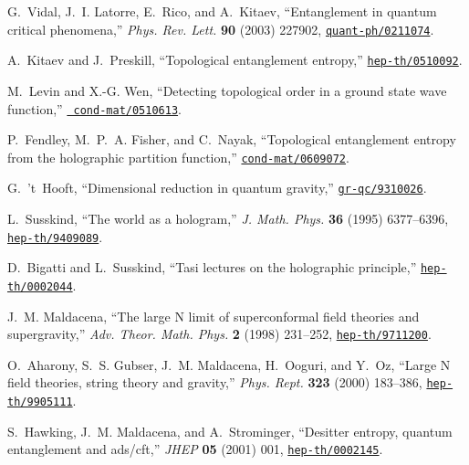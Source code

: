 \documentclass[12pt]{article}
\begin{document}
\begin{thebibliography}{10}
G.~Vidal, J.~I. Latorre, E.~Rico, and A.~Kitaev, ``Entanglement in quantum
  critical phenomena,'' {\em Phys. Rev. Lett.} {\bf 90} (2003)  227902,
\href{http://arxiv.org/abs/quant-ph/0211074}{{\tt quant-ph/0211074}}.

A.~Kitaev and J.~Preskill, ``Topological entanglement entropy,''
  \href{http://arxiv.org/abs/hep-th/0510092}{{\tt hep-th/0510092}}.

M.~Levin and X.-G. Wen, ``Detecting topological order in a ground state wave
  function,'' \href{http://arxiv.org/abs/cond-mat/0510613}{{\tt
  cond-mat/0510613}}.

P.~Fendley, M.~P.~A. Fisher, and C.~Nayak, ``Topological entanglement entropy
  from the holographic partition function,''
\href{http://arxiv.org/abs/cond-mat/0609072}{{\tt cond-mat/0609072}}.

G.~'t~Hooft, ``Dimensional reduction in quantum gravity,''
\href{http://arxiv.org/abs/gr-qc/9310026}{{\tt gr-qc/9310026}}.

L.~Susskind, ``The world as a hologram,'' {\em J. Math. Phys.} {\bf 36} (1995)
  6377--6396,
\href{http://arxiv.org/abs/hep-th/9409089}{{\tt hep-th/9409089}}.

D.~Bigatti and L.~Susskind, ``Tasi lectures on the holographic principle,''
\href{http://arxiv.org/abs/hep-th/0002044}{{\tt hep-th/0002044}}.

J.~M. Maldacena, ``The large N limit of superconformal field theories and
  supergravity,'' {\em Adv. Theor. Math. Phys.} {\bf 2} (1998)  231--252,
\href{http://arxiv.org/abs/hep-th/9711200}{{\tt hep-th/9711200}}.

O.~Aharony, S.~S. Gubser, J.~M. Maldacena, H.~Ooguri, and Y.~Oz, ``Large N
  field theories, string theory and gravity,'' {\em Phys. Rept.} {\bf 323}
  (2000)  183--386,
\href{http://arxiv.org/abs/hep-th/9905111}{{\tt hep-th/9905111}}.

S.~Hawking, J.~M. Maldacena, and A.~Strominger, ``Desitter entropy, quantum
  entanglement and ads/cft,'' {\em JHEP} {\bf 05} (2001)  001,
\href{http://arxiv.org/abs/hep-th/0002145}{{\tt hep-th/0002145}}.


\end{thebibliography}
\end{document}

